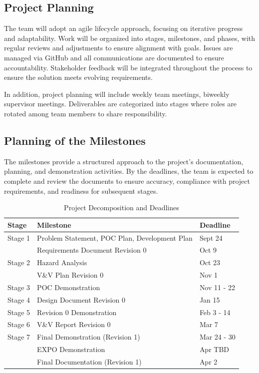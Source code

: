 \documentclass[12pt]{article}
\begin{document}
\subsection{Project Planning}

The team will adopt an agile lifecycle approach, focusing on iterative progress
and adaptability. Work will be organized into stages, milestones, and phases,
with regular reviews and adjustments to ensure alignment with goals. Issues are
managed via GitHub and all communications are documented to ensure
accountability. Stakeholder feedback will be integrated throughout the process
to ensure the solution meets evolving requirements.

In addition, project planning will include weekly team meetings, biweekly
supervisor meetings. Deliverables are categorized into stages where roles are
rotated among team members to share responsibility.

\subsection{Planning of the Milestones}

The milestones provide a structured approach to the project's documentation,
planning, and demonstration activities. By the deadlines, the team is expected
to complete and review the documents to ensure accuracy, compliance with project
requirements, and readiness for subsequent stages.

\begin{table}[htbp]
  \centering
  \begin{tabular}{|l|l|l|}
  \hline
  \textbf{Stage} & \textbf{Milestone} & \textbf{Deadline} \\
  \hline
  Stage 1 & Problem Statement, POC Plan, Development Plan & Sept 24 \\
  \texttt{} & Requirements Document Revision 0 & Oct 9 \\
  \hline
  Stage 2 & Hazard Analysis & Oct 23 \\
  \texttt{} & V\&V Plan Revision 0 & Nov 1 \\
  \hline
  Stage 3 & POC Demonstration & Nov 11 - 22 \\
  \hline
  Stage 4 & Design Document Revision 0 & Jan 15 \\
  \hline
  Stage 5 & Revision 0 Demonstration & Feb 3 - 14\\
  \hline
  Stage 6 & V\&V Report Revision 0 & Mar 7 \\
  \hline
  Stage 7 & Final Demonstration (Revision 1) & Mar 24 - 30\\
  \texttt{} & EXPO Demonstration & Apr TBD \\
  \texttt{} & Final Documentation (Revision 1) & Apr 2 \\
  \hline
  \end{tabular}
  \caption{Project Decomposition and Deadlines}
  \label{table:2}
\end{table}
\end{document}
